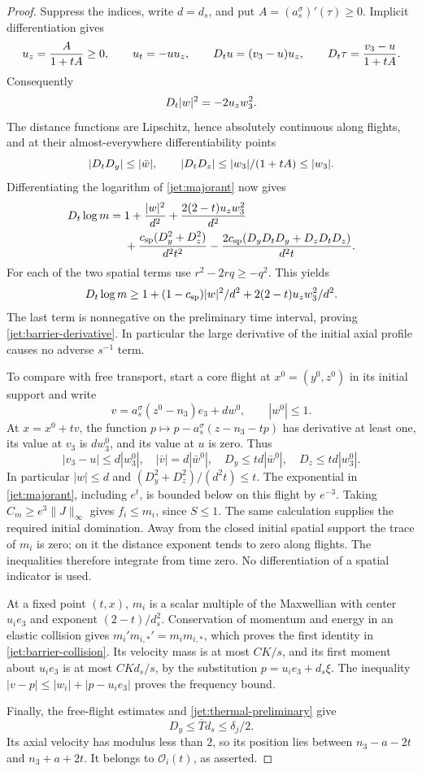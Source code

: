 \begin{proof}
Suppress the indices, write \(d=d_s\), and put
\(A=(a_s^\sigma)'(\tau)\ge0\).  Implicit differentiation gives
\begin{equation}
 u_z=\frac A{1+tA}\ge0,\qquad
 u_t=-u u_z,\qquad
 D_t u=(v_3-u)u_z,\qquad
 D_t\tau=\frac{v_3-u}{1+tA}.
 \label{jet:flow-identities}
\end{equation}
Consequently
\[
 D_t|w|^2=-2u_z w_3^2.
\]
The distance functions are Lipschitz, hence absolutely continuous
along flights, and at their almost-everywhere differentiability
points
\[
 |D_t D_y|\le|\bar w|,\qquad
 |D_t D_z|\le |w_3|/(1+tA)\le|w_3|.
\]
Differentiating the logarithm of \eqref{jet:majorant} now gives
\begin{align*}
 D_t\log m
 ={}&1+\frac{|w|^2}{d^2}
      +\frac{2(2-t)u_z w_3^2}{d^2}\\
    &+\frac{c_{\mathrm{sp}}(D_y^2+D_z^2)}{d^2t^2}
      -\frac{2c_{\mathrm{sp}}(D_yD_t D_y+D_zD_t D_z)}{d^2t}.
\end{align*}
For each of the two spatial terms use
\(r^2-2r q\ge-q^2\).  This yields
\[
 D_t\log m\ge
 1+(1-c_{\mathrm{sp}})|w|^2/d^2
   +2(2-t)u_z w_3^2/d^2.
\]
The last term is nonnegative on the preliminary time interval,
proving \eqref{jet:barrier-derivative}.  In particular the large
derivative of the initial axial profile causes no adverse
\(s^{-1}\) term.

To compare with free transport, start a core flight at
\(x^0=(y^0,z^0)\) in its initial support and write
\[
 v=a_s^\sigma(z^0-n_3)e_3+d w^0,\qquad |w^0|\le1.
\]
At \(x=x^0+tv\), the function
\(p\mapsto p-a_s^\sigma(z-n_3-tp)\) has derivative at least one,
its value at \(v_3\) is \(dw_3^0\), and its value at \(u\) is zero.
Thus
\[
 |v_3-u|\le d|w_3^0|,\quad |\bar v|=d|\bar w^0|,\quad
 D_y\le td|\bar w^0|,\quad D_z\le td|w_3^0|.
\]
In particular \(|w|\le d\) and
\((D_y^2+D_z^2)/(d^2t)\le t\).
The exponential in \eqref{jet:majorant}, including \(e^t\), is
bounded below on this flight by \(e^{-3}\).
Taking \(C_m\ge e^3\|J\|_\infty\) gives \(f_i\le m_i\), since
\(S\le1\).
The same calculation supplies the required initial domination.
Away from the closed initial spatial support the trace of \(m_i\)
is zero; on it the distance exponent tends to zero along flights.
The inequalities therefore integrate from time zero.  No
differentiation of a spatial indicator is used.

At a fixed point \((t,x)\), \(m_i\) is a scalar multiple of the
Maxwellian with center \(u_i e_3\) and exponent
\((2-t)/d_s^2\).  Conservation of momentum and energy in an elastic
collision gives \(m_i'm_{i,*}'=m_i m_{i,*}\), which proves the
first identity in \eqref{jet:barrier-collision}.  Its velocity mass
is at most \(CK/s\), and its first moment about \(u_i e_3\) is at
most \(CKd_s/s\), by the substitution
\(p=u_i e_3+d_s\xi\).  The inequality
\(|v-p|\le|w_i|+|p-u_i e_3|\) proves the frequency bound.

Finally, the free-flight estimates and
\eqref{jet:thermal-preliminary} give
\[
 D_y\le\overline T d_s\le\delta_j/2.
\]
Its axial velocity has modulus less than \(2\), so its position
lies between \(n_3-a-2t\) and \(n_3+a+2t\).
It belongs to \(\mathcal O_i(t)\), as asserted.
\end{proof}

